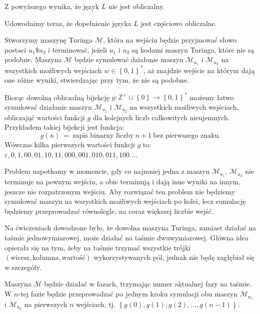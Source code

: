\documentclass[12pt]{article}
\begin{document}
	\medskip
	
	Z powyższego wynika, że język \(L\) nie jest obliczalny.
	
	\bigskip
	
	Udowodnimy teraz, że dopełnienie języka \(L\) jest częściowo obliczalne.
	
	\medskip
	
	Stworzymy maszynę Turinga \(\mathcal{M}\), która na wejściu będzie
	przyjmować słowo postaci \(u_{1} \$ u_{2}\) i terminować, jeżeli \(u_{1}\) i
	\(u_{2}\) są kodami maszyn Turinga, które nie są podobne. Maszyna
	\(\mathcal{M}\) będzie symulować działanie maszyn \(\mathcal{M}_{u_{1}}\) i
	\(\mathcal{M}_{u_{2}}\) na wszystkich możliwych wejściach \(w \in \left\{ 0,
	1 \right\} ^ {\ast}\), aż znajdzie wejście na którym dają one różne wyniki,
	stwierdzając przy tym, że nie są podobne.
	
	\medskip
	
	Biorąc dowolną obliczalną bijekcję \(g : \mathbb{Z}^{+} \cup \left\{ 0
	\right\} \rightarrow \left\{ 0, 1 \right\} ^ {\ast}\) możemy łatwo symulować
	działanie maszyn \(\mathcal{M}_{u_{1}}\) i \(\mathcal{M}_{u_{2}}\) na
	wszystkich możliwych wejściach, obliczająć wartości funkcji \(g\) dla
	kolejnych liczb całkowitych nieujemnych. Przykładem takiej bijekcji jest
	funkcja:
	\[ g \left( n \right) \ = \ \text{zapis binarny liczby} \ n + 1 \ \text{bez
	pierwszego znaku.} \]
	Wówczas kilka pierwszych wartości funkcji \(g\) to: \(\varepsilon, 0, 1, 00,
	01, 10, 11, 000, 001, 010, 011, 100 \ldots\).
	
	\medskip
	
	Problem napotkamy w momencie, gdy co najmniej jedna z maszyn
	\(\mathcal{M}_{u_{1}}\), \(\mathcal{M}_{u_{2}}\) nie terminuje na pewnym
	wejściu, a obie terminują i dają inne wyniki na innym, jeszcze nie
	rozpatrzonym wejściu. Aby rozwiązać ten problem nie będziemy symulować
	maszyn na wszystkich możliwych wejściach po kolei, lecz sumulację będziemy
	przeprowadzać równolegle, na coraz większej liczbie wejść.
	
	\medskip
	
	Na ćwiczeniach dowodzone było, że dowolna maszyna Turinga, zamiast działać
	na taśmie jednowymiarowej, może działać na taśmie dwuwymiarowej. Główna idea
	opierała się na tym, żeby na taśmie trzymać wszystkie trójki \(\left(
	\text{wiersz}, \text{kolumna}, \text{wartość} \right)\) wykorzystywanych
	pól, jednak nie będę zagłębiał się w szczegóły.
	
	\medskip
	
	Maszyna \(\mathcal{M}\) będzie działać w fazach, trzymając numer aktualnej
	fazy na taśmie. W \(n\)-tej fazie będzie przeprowadzać po jednym kroku
	symulacji obu maszyn \(\mathcal{M}_{u_{1}}\) i \(\mathcal{M}_{u_{2}}\)
	na pierwszych \(n\) wejściach, tj. \(\left\{ g \left( 0 \right), g \left( 1
	\right), g \left( 2 \right), \ldots, g \left( n - 1 \right) \right\}\).
	
\end{document}
